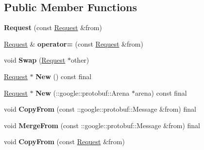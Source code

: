 \subsection*{Public Member Functions}
\begin{DoxyCompactItemize}
\item 
\mbox{\label{classcoappbrpc_1_1Request_a47a39167c3ce45e3c3fd7e02b1fc543d}} 
{\bfseries Request} (const \hyperlink{classcoappbrpc_1_1Request}{Request} \&from)
\item 
\mbox{\label{classcoappbrpc_1_1Request_a16ffbdf9dda710d5118fa74bac52d61a}} 
\hyperlink{classcoappbrpc_1_1Request}{Request} \& {\bfseries operator=} (const \hyperlink{classcoappbrpc_1_1Request}{Request} \&from)
\item 
\mbox{\label{classcoappbrpc_1_1Request_a98653b1ed247cbb328495fe00c8741b1}} 
void {\bfseries Swap} (\hyperlink{classcoappbrpc_1_1Request}{Request} $\ast$other)
\item 
\mbox{\label{classcoappbrpc_1_1Request_aeff1989d6f4b25ae7923492201489f75}} 
\hyperlink{classcoappbrpc_1_1Request}{Request} $\ast$ {\bfseries New} () const final
\item 
\mbox{\label{classcoappbrpc_1_1Request_a9b3c97de3afd1435da415cf623ca5a49}} 
\hyperlink{classcoappbrpc_1_1Request}{Request} $\ast$ {\bfseries New} (\+::google\+::protobuf\+::\+Arena $\ast$arena) const final
\item 
\mbox{\label{classcoappbrpc_1_1Request_a4d2f9d18648487a08edb25e1f9a6a4c2}} 
void {\bfseries Copy\+From} (const \+::google\+::protobuf\+::\+Message \&from) final
\item 
\mbox{\label{classcoappbrpc_1_1Request_a74dcbf992d27f7d18822e381dac3713c}} 
void {\bfseries Merge\+From} (const \+::google\+::protobuf\+::\+Message \&from) final
\item 
\mbox{\label{classcoappbrpc_1_1Request_a4c74f0343c8b770aab1074a3571ba9ce}} 
void {\bfseries Copy\+From} (const \hyperlink{classcoappbrpc_1_1Request}{Request} \&from)

\end{DoxyCompactItemize}
